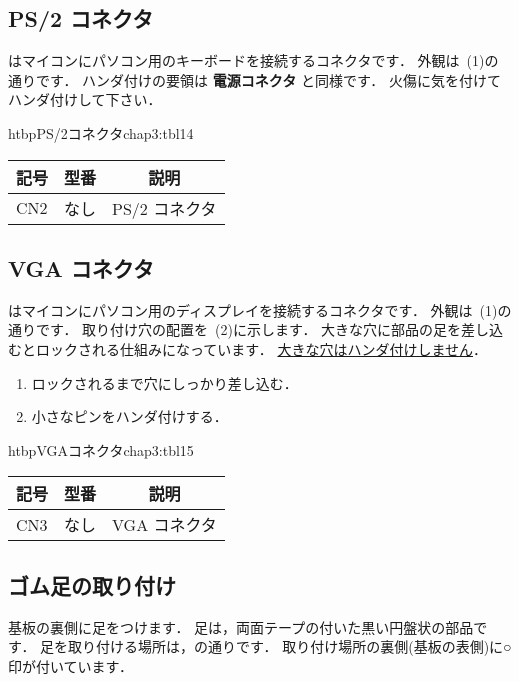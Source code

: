 \newpage
\subsection{PS/2 コネクタ}
はマイコンにパソコン用のキーボードを接続するコネクタです．
外観は~(1)の通りです．
ハンダ付けの要領は {\bf 電源コネクタ} と同様です．
火傷に気を付けてハンダ付けして下さい．

\begin{mytable}{htbp}{PS/2コネクタ}{chap3:tbl14}
\begin{tabular}{|l|l|l|}
\hline
\multicolumn{1}{|c|}{記号} &
\multicolumn{1}{c|}{型番} &
\multicolumn{1}{c|}{説明} \\
\hline
CN2 & なし & PS/2 コネクタ \\
\hline
\end{tabular}
\end{mytable}


\subsection{VGA コネクタ}
はマイコンにパソコン用のディスプレイを接続するコネクタです．
外観は~(1)の通りです．
取り付け穴の配置を~(2)に示します．
大きな穴に部品の足を差し込むとロックされる仕組みになっています．
\underline{大きな穴はハンダ付けしません}．

\begin{enumerate}
\item ロックされるまで穴にしっかり差し込む．
\item 小さなピンをハンダ付けする．
\end{enumerate}

\begin{mytable}{htbp}{VGAコネクタ}{chap3:tbl15}
\begin{tabular}{|l|l|l|}
\hline
\multicolumn{1}{|c|}{記号} &
\multicolumn{1}{c|}{型番} &
\multicolumn{1}{c|}{説明} \\
\hline
CN3 & なし & VGA コネクタ \\
\hline
\end{tabular}
\end{mytable}


\subsection{ゴム足の取り付け}
基板の裏側に足をつけます．
足は，両面テープの付いた黒い円盤状の部品です．
足を取り付ける場所は，の通りです．
取り付け場所の裏側(基板の表側)に○印が付いています．

